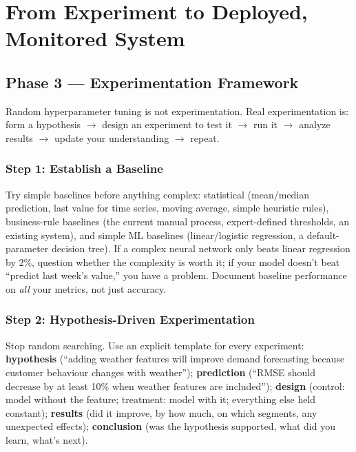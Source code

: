 \chapter{From Experiment to Deployed, Monitored System}
\label{ch:projects-b}

\section{Phase 3 --- Experimentation Framework}

\begin{keytakeaway}
Random hyperparameter tuning is not experimentation. Real experimentation is: form a hypothesis
$\rightarrow$ design an experiment to test it $\rightarrow$ run it $\rightarrow$ analyze results $\rightarrow$
update your understanding $\rightarrow$ repeat.
\end{keytakeaway}

\subsection{Step 1: Establish a Baseline}

Try simple baselines before anything complex: statistical (mean/median prediction, last value for time series,
moving average, simple heuristic rules), business-rule baselines (the current manual process, expert-defined
thresholds, an existing system), and simple ML baselines (linear/logistic regression, a default-parameter
decision tree). If a complex neural network only beats linear regression by 2\%, question whether the complexity
is worth it; if your model doesn't beat ``predict last week's value,'' you have a problem. Document baseline
performance on \emph{all} your metrics, not just accuracy.

\subsection{Step 2: Hypothesis-Driven Experimentation}

Stop random searching. Use an explicit template for every experiment: \textbf{hypothesis} (``adding weather
features will improve demand forecasting because customer behaviour changes with weather''); \textbf{prediction}
(``RMSE should decrease by at least 10\% when weather features are included''); \textbf{design} (control: model
without the feature; treatment: model with it; everything else held constant); \textbf{results} (did it improve,
by how much, on which segments, any unexpected effects); \textbf{conclusion} (was the hypothesis supported, what
did you learn, what's next).

